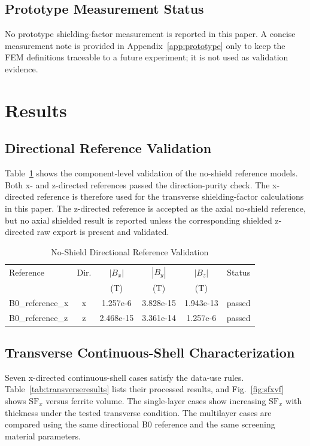 \documentclass[letterpaper,journal]{IEEEtran}
\begin{document}
\subsection{Prototype Measurement Status}

No prototype shielding-factor measurement is reported in this paper. A concise measurement note is provided in Appendix~\ref{app:prototype} only to keep the FEM definitions traceable to a future experiment; it is not used as validation evidence.

\section{Results}

\subsection{Directional Reference Validation}

Table~\ref{tab:b0validation} shows the component-level validation of the no-shield reference models. Both x- and z-directed references passed the direction-purity check. The x-directed reference is therefore used for the transverse shielding-factor calculations in this paper. The z-directed reference is accepted as the axial no-shield reference, but no axial shielded result is reported unless the corresponding shielded z-directed raw export is present and validated.

\begin{table}[!t]
\caption{No-Shield Directional Reference Validation}
\label{tab:b0validation}
\centering
\footnotesize
\setlength{\tabcolsep}{2.5pt}
\begin{tabular}{lccccc}
\toprule
Reference & Dir. & $|B_x|$ & $|B_y|$ & $|B_z|$ & Status \\
 & & (T) & (T) & (T) & \\
\midrule
B0\_reference\_x & x & 1.257e-6 & 3.828e-15 & 1.943e-13 & passed \\
B0\_reference\_z & z & 2.468e-15 & 3.361e-14 & 1.257e-6 & passed \\
\bottomrule
\end{tabular}
\end{table}

\subsection{Transverse Continuous-Shell Characterization}

Seven x-directed continuous-shell cases satisfy the data-use rules. Table~\ref{tab:transverseresults} lists their processed results, and Fig.~\ref{fig:sfxvf} shows $\mathrm{SF}_x$ versus ferrite volume. The single-layer cases show increasing $\mathrm{SF}_x$ with thickness under the tested transverse condition. The multilayer cases are compared using the same directional B0 reference and the same screening material parameters.
\end{document}
